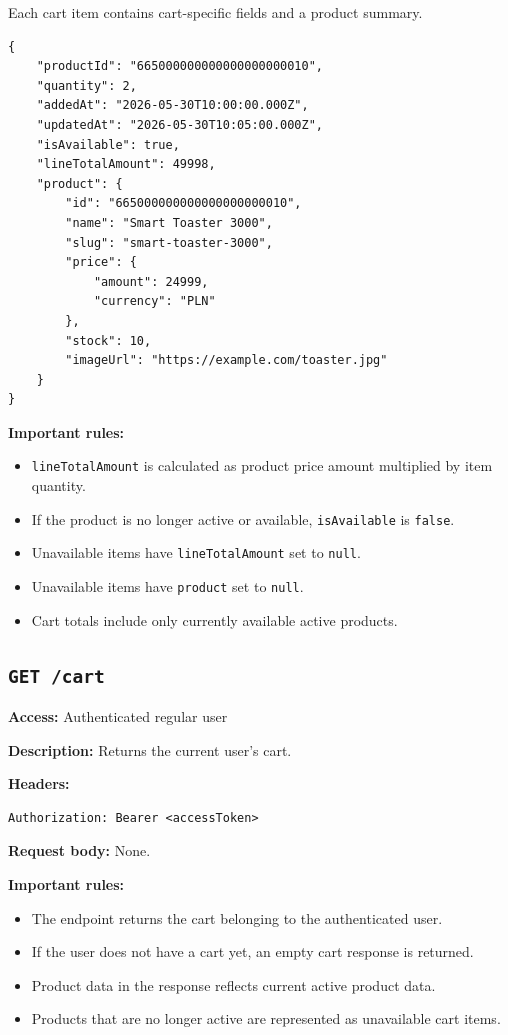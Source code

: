 Each cart item contains cart-specific fields and a product summary.

\begin{verbatim}
{
    "productId": "665000000000000000000010",
    "quantity": 2,
    "addedAt": "2026-05-30T10:00:00.000Z",
    "updatedAt": "2026-05-30T10:05:00.000Z",
    "isAvailable": true,
    "lineTotalAmount": 49998,
    "product": {
        "id": "665000000000000000000010",
        "name": "Smart Toaster 3000",
        "slug": "smart-toaster-3000",
        "price": {
            "amount": 24999,
            "currency": "PLN"
        },
        "stock": 10,
        "imageUrl": "https://example.com/toaster.jpg"
    }
}
\end{verbatim}

\textbf{Important rules:}

\begin{itemize}
    \item \texttt{lineTotalAmount} is calculated as product price amount multiplied by item quantity.
    \item If the product is no longer active or available, \texttt{isAvailable} is \texttt{false}.
    \item Unavailable items have \texttt{lineTotalAmount} set to \texttt{null}.
    \item Unavailable items have \texttt{product} set to \texttt{null}.
    \item Cart totals include only currently available active products.
\end{itemize}

\pagebreak
\subsection{\texttt{GET /cart}}

\textbf{Access:} Authenticated regular user

\textbf{Description:} Returns the current user's cart.

\textbf{Headers:}

\begin{verbatim}
Authorization: Bearer <accessToken>
\end{verbatim}

\textbf{Request body:} None.

\textbf{Important rules:}

\begin{itemize}
    \item The endpoint returns the cart belonging to the authenticated user.
    \item If the user does not have a cart yet, an empty cart response is returned.
    \item Product data in the response reflects current active product data.
    \item Products that are no longer active are represented as unavailable cart items.
\end{itemize}

